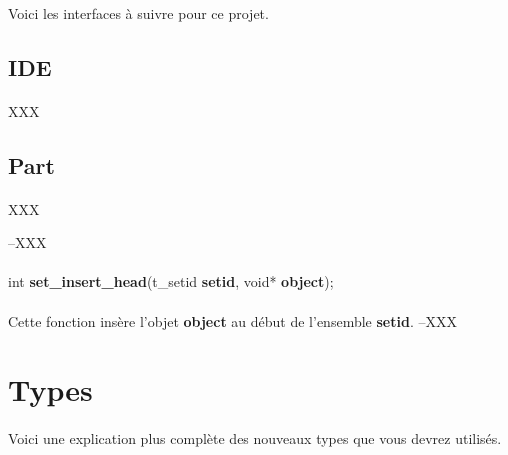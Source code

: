 \documentclass[10pt,a4wide]{article}
\begin{document}
\paragraph{}

Voici les interfaces \`a suivre pour ce projet.

\subsection{IDE}

\paragraph{}

XXX

\subsection{Part}

\paragraph{}

XXX

--XXX
\paragraph{}

\hspace{1.5cm}int \textbf{set\_insert\_head}(t\_setid \textbf{setid},
                                             void* \textbf{object});

\paragraph{}

Cette fonction ins\`ere l'objet \textbf{object} au d\'ebut de l'ensemble
\textbf{setid}.
--XXX

\section{Types}

\paragraph{}

Voici une explication plus compl\`ete des nouveaux types que
vous devrez utilis\'es.
\end{document}
